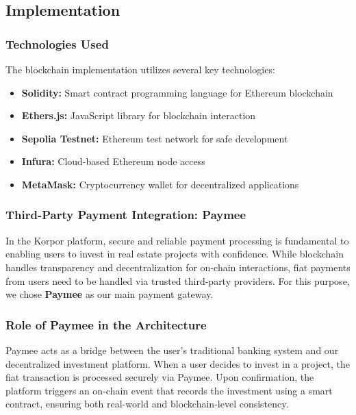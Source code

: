 \subsection{Implementation}
\subsubsection{Technologies Used}
The blockchain implementation utilizes several key technologies:

\begin{itemize}
    \item \textbf{Solidity:} Smart contract programming language for Ethereum blockchain
    \item \textbf{Ethers.js:} JavaScript library for blockchain interaction
    \item \textbf{Sepolia Testnet:} Ethereum test network for safe development
    \item \textbf{Infura:} Cloud-based Ethereum node access
    \item \textbf{MetaMask:} Cryptocurrency wallet for decentralized applications
\end{itemize}

\subsubsection{Third-Party Payment Integration: Paymee}

In the Korpor platform, secure and reliable payment processing is fundamental to enabling users to invest in real estate projects with confidence. While blockchain handles transparency and decentralization for on-chain interactions, fiat payments from users need to be handled via trusted third-party providers. For this purpose, we chose \textbf{Paymee} as our main payment gateway.


\subsubsection{Role of Paymee in the Architecture}

Paymee acts as a bridge between the user's traditional banking system and our decentralized investment platform. When a user decides to invest in a project, the fiat transaction is processed securely via Paymee. Upon confirmation, the platform triggers an on-chain event that records the investment using a smart contract, ensuring both real-world and blockchain-level consistency.

